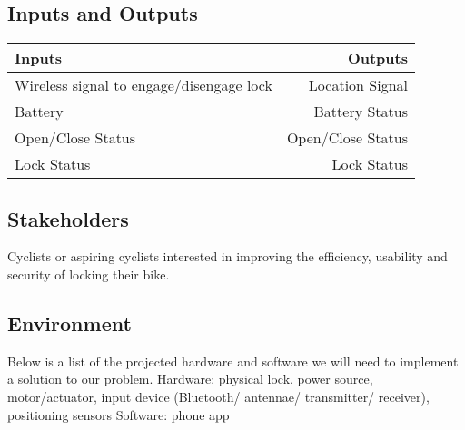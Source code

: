 \documentclass{article}
\begin{document}
\subsection{Inputs and Outputs}

\begin{table}[hI]
  \begin{center}
    \begin{tabular}{l|r}
      \textbf{Inputs} & \textbf{Outputs}\\
      \hline
      Wireless signal to engage/disengage lock  & Location Signal\\
      Battery & Battery Status\\
      Open/Close Status & Open/Close Status\\
      Lock Status & Lock Status\\
    \end{tabular}
  \end{center}
\end{table}


\subsection{Stakeholders}

Cyclists or aspiring cyclists interested in improving the efficiency, usability and security of locking their bike.

\subsection{Environment}

Below is a list of the projected hardware and software we will need to implement a solution to our problem.
Hardware: physical lock, power source, motor/actuator, input device (Bluetooth/ antennae/ transmitter/ receiver), positioning sensors 
Software: phone app

\end{document}
